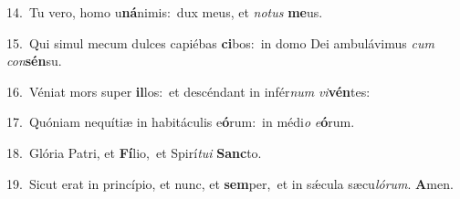 {\numbfont\textcolor{\numbcolor}{14.}}~Tu vero, homo u\-\textbf{ná}\-nimis:~\star dux meus, et \textit{no}\-\textit{tus} \textbf{me}\-us.\par
{\numbfont\textcolor{\numbcolor}{15.}}~Qui simul mecum dulces capiébas \textbf{ci}\-bos:~\star in domo Dei ambulávimus \textit{cum} \textit{con}\-\textbf{sén}su.\par
{\numbfont\textcolor{\numbcolor}{16.}}~Véniat mors super \textbf{il}\-los:~\star et descéndant in infér\textit{num} \textit{vi}\-\textbf{vén}tes:\par
{\numbfont\textcolor{\numbcolor}{17.}}~Quóniam nequítiæ in habitáculis e\-\textbf{ó}\-rum:~\star in médi\textit{o} \textit{e}\-\textbf{ó}rum.\par
{\numbfont\textcolor{\numbcolor}{18.}}~Glória Patri, et \textbf{Fí}\-lio,~\star et Spirí\-\textit{tu}\-\textit{i} \textbf{Sanc}\-to.\par
{\numbfont\textcolor{\numbcolor}{19.}}~Sicut erat in princípio, et nunc, et \textbf{sem}\-per,~\star et in sǽcula sæcu\-\textit{ló}\-\textit{rum}. \textbf{A}\-men.\par
